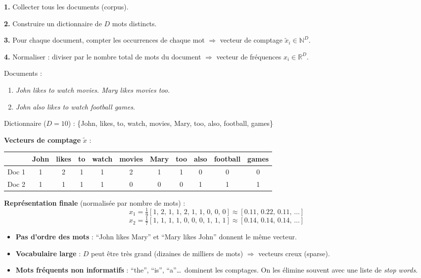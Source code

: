 \documentclass[11pt,a4paper,openany]{book}
\begin{document}
\begin{algbox}[title=Bag of Words — procédure]
\textbf{1.} Collecter tous les documents (corpus).

\textbf{2.} Construire un dictionnaire de $D$ mots distincts.

\textbf{3.} Pour chaque document, compter les occurrences de chaque mot $\Rightarrow$ vecteur de comptage $\tilde{x}_i \in \mathbb{N}^D$.

\textbf{4.} Normaliser : diviser par le nombre total de mots du document $\Rightarrow$ vecteur de fréquences $x_i \in \mathbb{R}^D$.
\end{algbox}

\begin{exbox}[title=Exemple BoW]
Documents :
\begin{enumerate}
    \item \textit{John likes to watch movies. Mary likes movies too.}
    \item \textit{John also likes to watch football games.}
\end{enumerate}

Dictionnaire ($D = 10$) : \{John, likes, to, watch, movies, Mary, too, also, football, games\}

\medskip
\textbf{Vecteurs de comptage} $\tilde{x}$ :

\renewcommand{\arraystretch}{1.3}
\begin{center}
\begin{tabular}{l|cccccccccc}
 & John & likes & to & watch & movies & Mary & too & also & football & games \\ \hline
Doc 1 & 1 & 2 & 1 & 1 & 2 & 1 & 1 & 0 & 0 & 0 \\
Doc 2 & 1 & 1 & 1 & 1 & 0 & 0 & 0 & 1 & 1 & 1 \\
\end{tabular}
\end{center}

\medskip
\textbf{Représentation finale} (normalisée par nombre de mots) :
\[
x_1 = \tfrac{1}{9}[1,\,2,\,1,\,1,\,2,\,1,\,1,\,0,\,0,\,0] \approx [0.11,\,0.22,\,0.11,\,\ldots]
\]
\[
x_2 = \tfrac{1}{7}[1,\,1,\,1,\,1,\,0,\,0,\,0,\,1,\,1,\,1] \approx [0.14,\,0.14,\,0.14,\,\ldots]
\]
\end{exbox}

\begin{rembox}[title=Limitations du BoW]
\begin{itemize}
    \item \textbf{Pas d'ordre des mots} : ``John likes Mary'' et ``Mary likes John'' donnent le même vecteur.
    \item \textbf{Vocabulaire large} : $D$ peut être très grand (dizaines de milliers de mots) $\Rightarrow$ vecteurs creux (sparse).
    \item \textbf{Mots fréquents non informatifs} : ``the'', ``is'', ``a''\dots\ dominent les comptages. On les élimine souvent avec une liste de \textit{stop words}.
\end{itemize}
\end{rembox}
\end{document}

